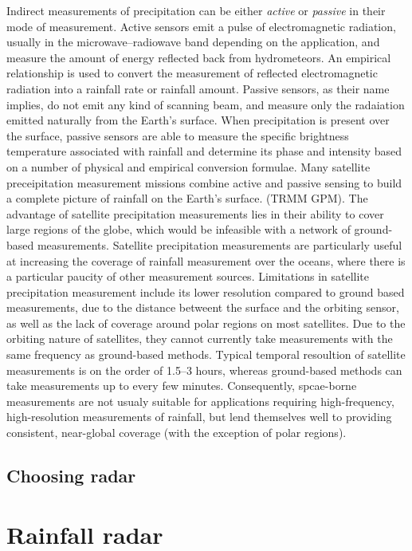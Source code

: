 Indirect measurements of precipitation can be either \textit{active} or \textit{passive} in their mode of measurement. Active sensors emit a pulse of electromagnetic radiation, usually in the microwave--radiowave band depending on the application, and measure the amount of energy reflected back from hydrometeors. An empirical relationship is used to convert the measurement of reflected electromagnetic radiation into a rainfall rate or rainfall amount. Passive sensors, as their name implies, do not emit any kind of scanning beam, and measure only the radaiation emitted naturally from the Earth's surface. When precipitation is present over the surface, passive sensors are able to measure the specific brightness temperature associated with rainfall and determine its phase and intensity based on a number of physical and empirical conversion formulae. Many satellite preceipitation measurement missions combine active and passive sensing to build a complete picture of rainfall on the Earth's surface. (TRMM GPM). The advantage of satellite precipitation measurements lies in their ability to cover large regions of the globe, which would be infeasible with a network of ground-based measurements. Satellite precipitation measurements are particularly useful at increasing the coverage of rainfall measurement over the oceans, where there is a particular paucity of other measurement sources. Limitations in satellite precipitation measurement include its lower resolution compared to ground based measurements, due to the distance betweent the surface and the orbiting sensor, as well as the lack of coverage around polar regions on most satellites. Due to the orbiting nature of satellites, they cannot currently take measurements with the same frequency as ground-based methods. Typical temporal resoultion of satellite measurements is on the order of 1.5--3 hours, whereas ground-based methods can take measurements up to every few minutes. Consequently, spcae-borne measurements are not usualy suitable for applications requiring high-frequency, high-resolution measurements of rainfall, but lend themselves well to providing consistent, near-global coverage (with the exception of polar regions). 



\subsection{Choosing radar}


\section{Rainfall radar}

